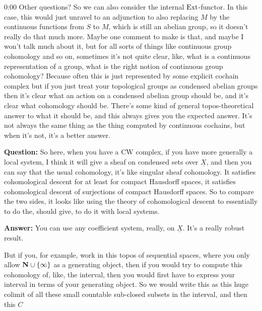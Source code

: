 \begin{unfinished}{0:00}
Other questions? So we can also consider the internal $\operatorname{Ext}$-functor. In this case, this would just unravel to an adjunction to also replacing $M$ by the continuous functions from $S$ to $M$, which is still an abelian group, so it doesn't really do that much more. 
Maybe one comment to make is that, and maybe I won't talk much about it, but for all sorts of things like continuous group cohomology and so on, sometimes it's not quite clear, like, what is a continuous representation of a group, what is the right notion of continuous group cohomology? Because often this is just represented by some explicit cochain complex but if you just treat your topological groups as condensed abelian groups then it's clear what an action on a condensed abelian group should be, and it's clear what cohomology should be. There's some kind of general topos-theoretical answer to what it should be, and this always gives you the expected answer. It's not always the same thing as the thing computed by continuous cochains, but when it's not, it's a better answer.

\textbf{Question:} So here, when you have a CW complex, if you have more generally a local system, I think it will give a sheaf on condensed sets over $\underline{X}$, and then you can say that the usual cohomology, it's like singular sheaf cohomology. It satisfies cohomological descent for at least for compact Hausdorff spaces, it satisfies cohomological descent of surjections of compact Hausdorff spaces. So to compare the two sides, it looks like using the theory of cohomological descent to essentially to do the, should give, to do it with local systems. 

\textbf{Answer:} You can use any coefficient system, really, on $\underline{X}$. It's a really robust result.

But if you, for example, work in this topos of sequential spaces, where you only allow $\mathbf N \cup \{\infty\}$ as a generating object, then if you would try to compute this cohomology of, like, the interval, then you would first have to express your interval in terms of your generating object. So we would write this as this huge colimit of all these small countable sub-closed subsets in the interval, and then this $C$

\end{unfinished}